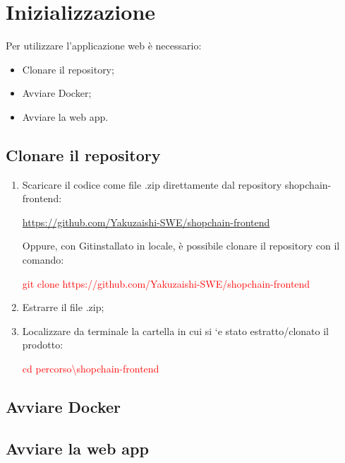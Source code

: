 \section{Inizializzazione}

Per utilizzare l’applicazione web è necessario:
\begin{itemize}
    \item Clonare il repository;
    \item Avviare Docker;
    \item Avviare la web app.
\end{itemize}

\subsection{Clonare il repository}

\begin{enumerate}
    \item Scaricare il codice come file .zip direttamente dal repository shopchain-frontend:
            \begin{center}
                \href{https://github.com/Yakuzaishi-SWE/shopchain-frontend}{https://github.com/Yakuzaishi-SWE/shopchain-frontend}
            \end{center}
            Oppure, con Git\glo installato in locale, è possibile clonare il repository con il comando:
            \begin{center}
                \textcolor{red}{git clone https://github.com/Yakuzaishi-SWE/shopchain-frontend}
            \end{center}
    \item Estrarre il file .zip;
    \item Localizzare da terminale la cartella in cui si `e stato estratto/clonato il prodotto:
            \begin{center}
                \textcolor{red}{cd percorso\textbackslash shopchain-frontend}
            \end{center}
\end{enumerate}

\subsection{Avviare Docker}

\subsection{Avviare la web app}